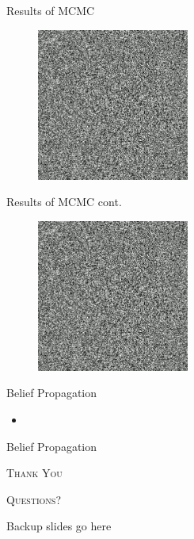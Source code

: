 \documentclass{minesbeamer}
\begin{document}
\begin{frame}{Results of MCMC}
    \centering
    \begin{figure}
    \includegraphics[width = 10 cm, height = 5cm]{mcmc.png}
    \end{figure}
\end{frame}

\begin{frame}{Results of MCMC cont.}
    \centering
    \begin{figure}
    \href{https://drive.google.com/file/d/1HwG_GxrhNblpf6vEiYciI8tJVZLoPw_y/view?usp=drive_link}{\includegraphics[width = 5 cm, height = 5cm]{mcmc.png}}
    \end{figure}
\end{frame}

\begin{frame}{Belief Propagation}
    \centering
    \begin{itemize}
        \item
    \end{itemize}
\end{frame}{Belief Propagation}




\begin{frame}[standout]
    \Huge\textsc{Thank You}
    
    \vfill
    
    \LARGE\textsc{Questions?}
\end{frame}

\appendix

\begin{frame}{Backup slides go here}
    
\end{frame}
\end{document}
